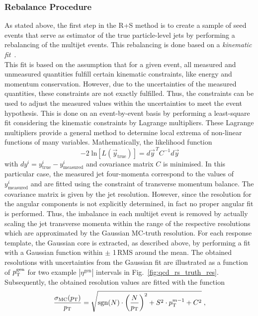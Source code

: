 \subsubsection*{Rebalance Procedure}
\label{subsubsec:qcd_rebalancing}
As stated above, the first step in the R+S method is to create a sample of seed events that serve as estimator of the true particle-level jets by performing a rebalancing of the multijet events. This rebalancing is done based on a \textit{kinematic fit}~\cite{D'Hondt:926540}. \\
This fit is based on the assumption that for a given event, all measured and unmeasured quantities fulfill certain kinematic constraints, like energy and momentum conservation. However, due to the uncertainties of the measured quantities, these constraints are not exactly fulfilled. Thus, the constraints can be used to adjust the measured values within the uncertainties to meet the event hypothesis. This is done on an event-by-event basis by performing a least-square fit considering the kinematic constraints by Lagrange multipliers. These Lagrange multipliers provide a general method to determine local extrema of non-linear functions of many variables. Mathematically, the likelihood function 
\begin{equation}
-2 \; \mathrm{ln}[L(\vec{y}_\mathrm{true})] = d\vec{y}^{\,T} C^{-1} d \vec{y} 
\end{equation}
with $dy^i = y_{\mathrm{true}}^i - y_{\mathrm{measured}}^i$ and covariance matrix $C$ is minimised. In this particular case, the measured jet four-momenta correspond to the values of $y_{\mathrm{measured}}^i$ and are fitted using the constraint of transverse momentum balance. The covariance matrix is given by the jet resolution. However, since the resolution for the angular components is not explicitly determined, in fact no proper angular fit is performed. Thus, the imbalance in each multijet event is removed by actually scaling the jet transverse momenta within the range of the respective resolutions which are approximated by the Gaussian MC-truth resolution. For each response template, the Gaussian core is extracted, as described above, by performing a fit with a Gaussian function within $\pm$ 1\,RMS around the mean. The obtained resolutions with uncertainties from the Gaussian fit are illustrated as a function of $p_{\text{T}}^\mathrm{gen}$ for two example $|\eta^\mathrm{gen}|$ intervals in Fig.~\ref{fig:qcd_rs_truth_res}. Subsequently, the obtained resolution values are fitted with the function
\begin{equation}
\frac{\sigma_\mathrm{MC}(p_{\text{T}})}{p_{\text{T}}} = \sqrt{\mathrm{sgn}(N) \cdot \left(\frac{N}{p_{\text{T}}}\right)^2 + S^2 \cdot p_{\text{T}}^{m-1} + C^2} \; ,
\end{equation} 
